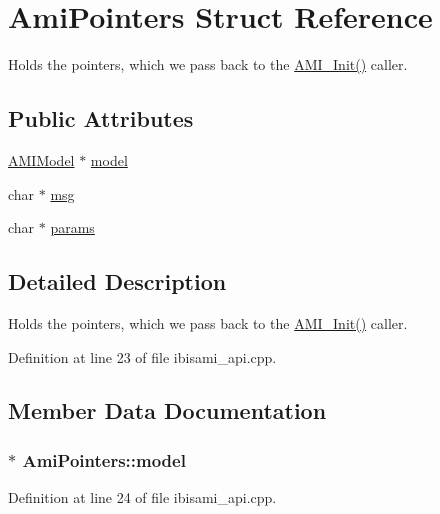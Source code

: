 \hypertarget{struct_ami_pointers}{}\section{Ami\+Pointers Struct Reference}
\label{struct_ami_pointers}


Holds the pointers, which we pass back to the \hyperlink{ibisami__api_8cpp_a2518d31187e06bed6023ec23657faab9}{A\+M\+I\+\_\+\+Init()} caller.  


\subsection*{Public Attributes}
\begin{DoxyCompactItemize}
\item 
\hyperlink{class_a_m_i_model}{A\+M\+I\+Model} $\ast$ \hyperlink{struct_ami_pointers_a382ab778612377867999da1da37eb970}{model}
\item 
char $\ast$ \hyperlink{struct_ami_pointers_a4922e9e0eb86e7515c5d60a4be512657}{msg}
\item 
char $\ast$ \hyperlink{struct_ami_pointers_a4a71183d01dde25a4cb9fabb89ee6d01}{params}
\end{DoxyCompactItemize}


\subsection{Detailed Description}
Holds the pointers, which we pass back to the \hyperlink{ibisami__api_8cpp_a2518d31187e06bed6023ec23657faab9}{A\+M\+I\+\_\+\+Init()} caller. 

Definition at line 23 of file ibisami\+\_\+api.\+cpp.



\subsection{Member Data Documentation}
\hypertarget{struct_ami_pointers_a382ab778612377867999da1da37eb970}{}
\subsubsection[{model}]{$\ast$ Ami\+Pointers\+::model}\label{struct_ami_pointers_a382ab778612377867999da1da37eb970}


Definition at line 24 of file ibisami\+\_\+api.\+cpp.

